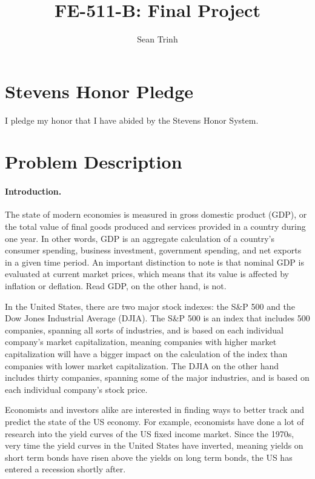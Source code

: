 \documentclass[11pt]{article}
\numberwithin{equation}{section}
\begin{document}
\title{FE-511-B: Final Project}

\author{Sean Trinh}


\maketitle

\section{Stevens Honor Pledge}

I pledge my honor that I have abided by the Stevens Honor System.

\section{Problem Description}

\paragraph{Introduction.}

The state of modern economies is measured in gross domestic product (GDP), or the total value of final goods produced and services provided in a country during one year. In other words, GDP is an aggregate calculation of a country's consumer spending, business investment, government spending, and net exports in a given time period. An important distinction to note is that nominal GDP is evaluated at current market prices, which means that its value is affected by inflation or deflation. Read GDP, on the other hand, is not.

In the United States, there are two major stock indexes: the S\&P 500 and the Dow Jones Industrial Average (DJIA). The S\&P 500 is an index that includes 500 companies, spanning all sorts of industries, and is based on each individual company's market capitalization, meaning companies with higher market capitalization will have a bigger impact on the calculation of the index than companies with lower market capitalization. The DJIA on the other hand includes thirty companies, spanning some of the major industries, and is based on each individual company's stock price.

Economists and investors alike are interested in finding ways to better track and predict the state of the US economy. For example, economists have done a lot of research into the yield curves of the US fixed income market. Since the 1970s, very time the yield curves in the United States have inverted, meaning yields on short term bonds have risen above the yields on long term bonds, the US has entered a recession shortly after.
\end{document}
